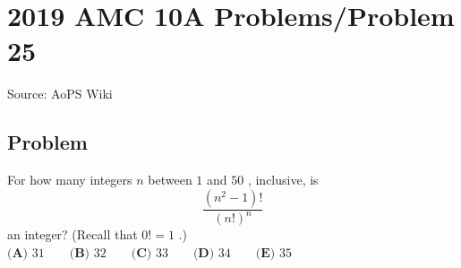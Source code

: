\documentclass[12pt]{article}
\begin{document}
\section*{{2019 AMC 10A Problems/Problem 25}}
Source: AoPS Wiki

\subsection*{Problem}
For how many integers $n$ between $1$ and $50$ , inclusive, is \[\frac{(n^2-1)!}{(n!)^n}\] an integer? (Recall that $0! = 1$ .) $\textbf{(A) } 31 \qquad \textbf{(B) } 32 \qquad \textbf{(C) } 33 \qquad \textbf{(D) } 34 \qquad \textbf{(E) } 35$
\end{document}
